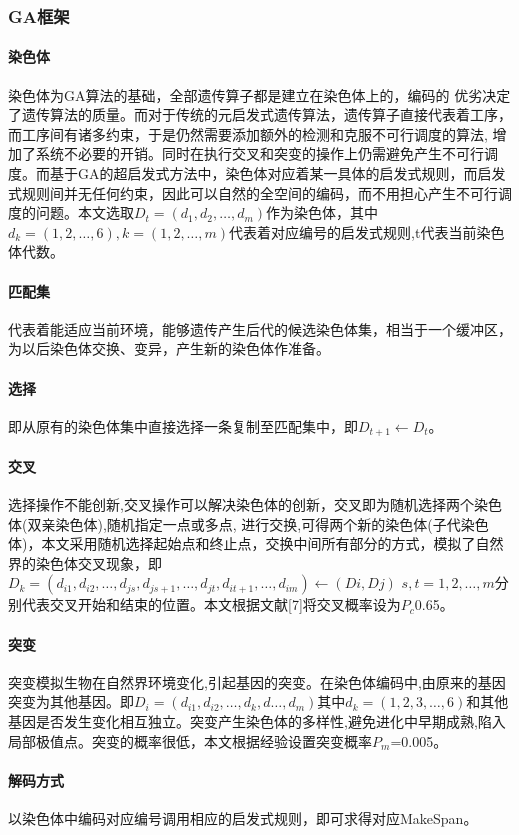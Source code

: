 \documentclass[UTF8]{ctexart}
\begin{document}
\begin{multicols}{2}
\subsubsection{GA框架}
\paragraph{染色体}染色体为GA算法的基础，全部遗传算子都是建立在染色体上的，编码的
优劣决定了遗传算法的质量。而对于传统的元启发式遗传算法，遗传算子直接代表着工序，而工序间有诸多约束，于是仍然需要添加额外的检测和克服不可行调度的算法, 增加了系统不必要的开销。同时在执行交叉和突变的操作上仍需避免产生不可行调度。而基于GA的超启发式方法中，染色体对应着某一具体的启发式规则，而启发式规则间并无任何约束，因此可以自然的全空间的编码，而不用担心产生不可行调度的问题。本文选取$D_t=(d_{1},d_{2},\ldots,d_{m})$作为染色体，其中$d_k = (1,2,\ldots,6) ,k = (1,2,\ldots,m)$代表着对应编号的启发式规则,t代表当前染色体代数。
\paragraph{匹配集}代表着能适应当前环境，能够遗传产生后代的候选染色体集，相当于一个缓冲区，为以后染色体交换、变异，产生新的染色体作准备。
\paragraph{选择}即从原有的染色体集中直接选择一条复制至匹配集中，即$D_{t+1}\leftarrow D_t$。
\paragraph{交叉}选择操作不能创新,交叉操作可以解决染色体的创新，交叉即为随机选择两个染色体(双亲染色体),随机指定一点或多点, 进行交换,可得两个新的染色体(子代染色体)，本文采用随机选择起始点和终止点，交换中间所有部分的方式，模拟了自然界的染色体交叉现象，即$D_k=(d_{i1},d_{i2},\ldots,d_{js},d_{js+1},\ldots,d_{jt},d_{it+1},\ldots,d_{im}) \leftarrow (Di,Dj)$ $s,t = 1,2,\ldots,m$分别代表交叉开始和结束的位置。本文根据文献[7]将交叉概率设为$P_c$0.65。
\paragraph{突变}突变模拟生物在自然界环境变化,引起基因的突变。在染色体编码中,由原来的基因突变为其他基因。即$D_i=(d_{i1},d_{i2},\ldots,d_k,d\ldots,d_m)$其中$d_k=(1,2,3,\ldots,6)$和其他基因是否发生变化相互独立。突变产生染色体的多样性,避免进化中早期成熟,陷入局部极值点。突变的概率很低，本文根据经验设置突变概率$P_m$=0.005。
\paragraph{解码方式}以染色体中编码对应编号调用相应的启发式规则，即可求得对应MakeSpan。

\end{multicols}
\end{document}
